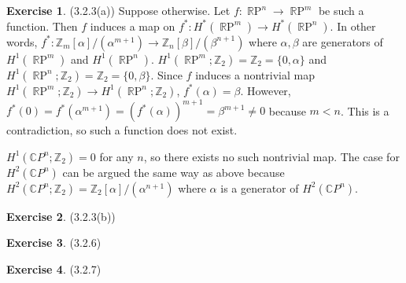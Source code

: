 \documentclass[12pt, psamsfonts]{amsart}
\theoremstyle{definition}
\newtheorem*{exer}{Exercise}
\theoremstyle{remark}
\DeclareMathOperator{\RP}{\mathbb{R}P}
\numberwithin{equation}{section}
\begin{document}
\begin{exer}{(3.2.3(a))}
  Suppose otherwise.
  Let $f: \RP^n \rightarrow \RP^m$ be such a function.
  Then $f$ induces a map on $f^{\ast}: H^{\ast}(\RP^m) \rightarrow H^{\ast}(\RP^n)$.
  In other words, $f^{\ast}: \mathbb{Z}_m[\alpha]/(\alpha^{m + 1}) \rightarrow \mathbb{Z}_n[\beta]/(\beta^{n + 1})$ where $\alpha, \beta$ are generators of $H^1(\RP^m)$ and $H^1(\RP^n)$.
  $H^1(\RP^m; \mathbb{Z}_2) = \mathbb{Z}_2 = \{ 0, \alpha \}$ and $H^1(\RP^n; \mathbb{Z}_2) = \mathbb{Z}_2 = \{ 0, \beta \}$.
  Since $f$ induces a nontrivial map $H^1(\RP^m; \mathbb{Z}_2) \rightarrow H^1(\RP^n; \mathbb{Z}_2)$, $f^{\ast}(\alpha) = \beta$.
  However, $f^{\ast}(0) = f^{\ast}(\alpha^{m + 1}) = (f^{\ast}(\alpha))^{m + 1} = \beta^{m + 1} \ne 0$ because $m < n$.
  This is a contradiction, so such a function does not exist.

  $H^1(\mathbb{C}P^n; \mathbb{Z}_2) = 0$ for any $n$, so there exists no such nontrivial map.
  The case for $H^2(\mathbb{C}P^n)$ can be argued the same way as above because $H^2(\mathbb{C}P^n;\mathbb{Z}_2) = \mathbb{Z}_2[\alpha]/(\alpha^{n + 1})$ where $\alpha$ is a generator of $H^2(\mathbb{C}P^n)$.
\end{exer}

\begin{exer}{(3.2.3(b))}
\end{exer}

\begin{exer}{(3.2.6)}
\end{exer}

\begin{exer}{(3.2.7)}
\end{exer}
\end{document}
